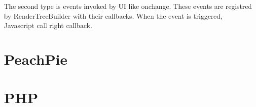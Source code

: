The second type is events invoked by UI like onchange. These events are registred by RenderTreeBuilder with their callbacks. When the event is triggered, Javascript call right callback.

\section{PeachPie}


\section{PHP}

